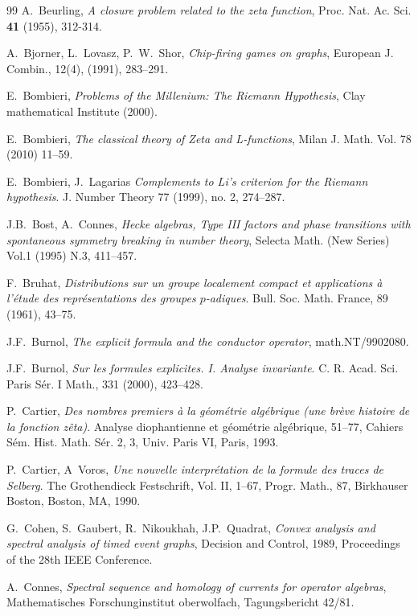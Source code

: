 \documentclass[12pt]{article}
\begin{document}
\begin{thebibliography}{99}
\bibitem{[Bg]} A.~Beurling, {\em  A closure problem related to the zeta function},
 Proc. Nat. Ac. Sci. {\bf 41} (1955), 312-314.

 A.~Bjorner, L.~Lovasz,  P.~W.~Shor, {\em Chip-firing games on graphs}, European
J. Combin.,  12(4), (1991), 283--291.

 E.~Bombieri, {\em Problems of the Millenium:
The Riemann Hypothesis}, Clay mathematical Institute (2000).

 E.~Bombieri, {\em The classical theory of Zeta and L-functions},
Milan J. Math. Vol. 78 (2010) 11--59.

 E.~Bombieri, J.~Lagarias {\em Complements to Li's criterion for the Riemann hypothesis}. J. Number Theory 77 (1999), no. 2, 274--287.

 J.B.~Bost, A.~Connes, {\em Hecke algebras, Type III
factors and phase transitions with spontaneous symmetry breaking in
number theory}, Selecta Math. (New Series) Vol.1 (1995) N.3,
411--457.



 F.~Bruhat,
{\em Distributions sur un groupe localement compact et applications
\`a l'\'etude des repr\'esentations des groupes $p$-adiques}.
Bull. Soc. Math. France,   89  (1961), 43--75.

 J.F.~Burnol, {\em The explicit formula
and the conductor operator}, math.NT/9902080.

  J.F.~Burnol, {\em Sur les formules explicites. I. Analyse invariante}. C. R. Acad. Sci. Paris S\' er. I Math., 331 (2000), 423--428.

 P.~Cartier, {\em Des nombres premiers \`a la g\' eom\' etrie alg\' ebrique (une br\`eve histoire de la fonction z\^ eta)}. 
Analyse diophantienne et g\' eom\' etrie alg\' ebrique, 51--77, Cahiers S\' em. Hist. Math. S\' er. 2, 3, Univ. Paris VI, Paris, 1993.


 P.~Cartier, A~Voros, {\em Une nouvelle interpr\' etation de la formule des traces de Selberg}. 
The Grothendieck Festschrift, Vol. II, 1--67, Progr. Math., 87, Birkhauser Boston, Boston, MA, 1990. 

 G.~Cohen, S.~Gaubert, R.~Nikoukhah, J.P.~Quadrat,  {\em Convex analysis and spectral analysis of timed event graphs}, Decision and Control, 1989, Proceedings of the 28th IEEE Conference.



 A.~Connes, {\em Spectral sequence and homology of currents for operator algebras},
  Mathematisches Forschunginstitut oberwolfach, Tagungsbericht 42/81.



\end{thebibliography}
\end{document}
